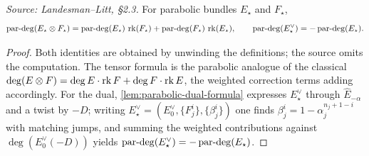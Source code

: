 \begin{lemma}
  \label{lem:degree-in-duals}
  \textit{Source: Landesman--Litt, \S2.3.}
  For parabolic bundles $E_\star$ and $F_\star$,
  \[
    \operatorname{par\text{-}deg}(E_\star \otimes F_\star) = \operatorname{par\text{-}deg}(E_\star)\,\operatorname{rk}(F_\star) +
      \operatorname{par\text{-}deg}(F_\star)\,\operatorname{rk}(E_\star), \qquad
    \operatorname{par\text{-}deg}(E^\vee_\star) = -\operatorname{par\text{-}deg}(E_\star) .
  \]
\end{lemma}

\begin{proof}
  Both identities are obtained by unwinding the definitions; the source omits the
  computation. The tensor formula is the parabolic analogue of the classical
  $\deg(E \otimes F) = \deg E \cdot \operatorname{rk} F + \deg F \cdot \operatorname{rk} E$, the weighted
  correction terms adding accordingly. For the dual,
  \cref{lem:parabolic-dual-formula} expresses $E^\vee_\star$ through
  $\widehat{E}_{-\alpha}$ and a twist by $-D$; writing
  $E^\vee_\star = (E^\vee_0, \{F^i_j\}, \{\beta^i_j\})$ one finds
  $\beta^i_j = 1 - \alpha^{n_j+1-i}_j$ with matching jumps, and summing the
  weighted contributions against $\deg(E^\vee_0(-D))$ yields
  $\operatorname{par\text{-}deg}(E^\vee_\star) = -\operatorname{par\text{-}deg}(E_\star)$.
\end{proof}

